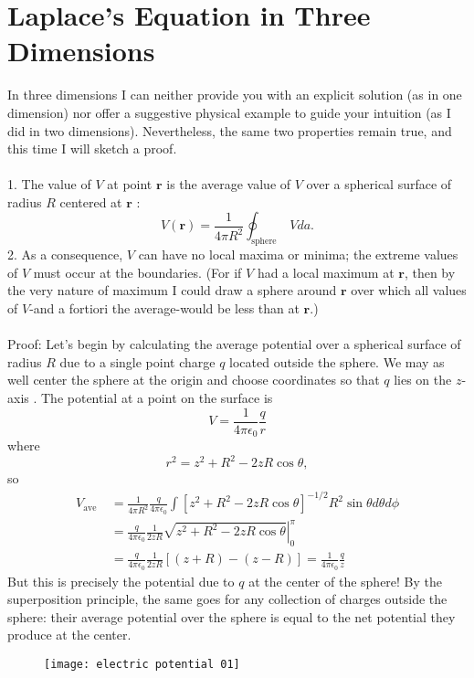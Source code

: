 \section{Laplace's Equation in Three Dimensions}
In three dimensions I can neither provide you with an explicit solution (as in one dimension) nor offer a suggestive physical example to guide your intuition (as I did in two dimensions). Nevertheless, the same two properties remain true, and this time I will sketch a proof.\\\\
1. The value of $V$ at point $\mathbf{r}$ is the average value of $V$ over a spherical surface of radius $R$ centered at $\mathbf{r}$ :
$$
V(\mathbf{r})=\frac{1}{4 \pi R^{2}} \oint_{\text {sphere }} V d a .
$$
2. As a consequence, $V$ can have no local maxima or minima; the extreme values of $V$ must occur at the boundaries. (For if $V$ had a local maximum at $\mathbf{r}$, then by the very nature of maximum I could draw a sphere around $\mathbf{r}$ over which all values of $V$-and a fortiori the average-would be less than at $\mathbf{r}$.)\\\\
Proof: Let's begin by calculating the average potential over a spherical surface of radius $R$ due to a single point charge $q$ located outside the sphere. We may as well center the sphere at the origin and choose coordinates so that $q$ lies on the $z$-axis . The potential at a point on the surface is
$$
V=\frac{1}{4 \pi \epsilon_{0}} \frac{q}{r}
$$
where
$$
r^{2}=z^{2}+R^{2}-2 z R \cos \theta,
$$
so
$$
\begin{aligned}
V_{\text {ave }} &=\frac{1}{4 \pi R^{2}} \frac{q}{4 \pi \epsilon_{0}} \int\left[z^{2}+R^{2}-2 z R \cos \theta\right]^{-1 / 2} R^{2} \sin \theta d \theta d \phi \\
&=\left.\frac{q}{4 \pi \epsilon_{0}} \frac{1}{2 z R} \sqrt{z^{2}+R^{2}-2 z R \cos \theta}\right|_{0} ^{\pi} \\
&=\frac{q}{4 \pi \epsilon_{0}} \frac{1}{2 z R}[(z+R)-(z-R)]=\frac{1}{4 \pi \epsilon_{0}} \frac{q}{z}
\end{aligned}
$$
But this is precisely the potential due to $q$ at the center of the sphere! By the superposition principle, the same goes for any collection of charges outside the sphere: their average potential over the sphere is equal to the net potential they produce at the center. 
\begin{figure}[H]
	\centering
	\texttt{[image: electric potential 01]}
	\caption{}
	\label{}
\end{figure}
